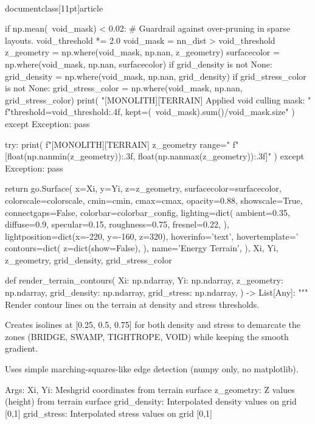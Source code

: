 \\documentclass[11pt]{article}
\begin{document}
\begin{CodeBlock}
            if np.mean(~void_mask) < 0.02:
                # Guardrail against over-pruning in sparse layouts.
                void_threshold *= 2.0
                void_mask = nn_dist > void_threshold
            z_geometry = np.where(void_mask, np.nan, z_geometry)
            surfacecolor = np.where(void_mask, np.nan, surfacecolor)
            if grid_density is not None:
                grid_density = np.where(void_mask, np.nan, grid_density)
            if grid_stress_color is not None:
                grid_stress_color = np.where(void_mask, np.nan, grid_stress_color)
            print(
                "[MONOLITH][TERRAIN] Applied void culling mask: "
                f"threshold={void_threshold:.4f}, kept={(~void_mask).sum()}/{void_mask.size}"
            )
    except Exception:
        pass

    try:
        print(
            f"[MONOLITH][TERRAIN] z_geometry range="
            f"[{float(np.nanmin(z_geometry)):.3f}, {float(np.nanmax(z_geometry)):.3f}]"
        )
    except Exception:
        pass

    return go.Surface(
        x=Xi,
        y=Yi,
        z=z_geometry,
        surfacecolor=surfacecolor,
        colorscale=colorscale,
        cmin=cmin,
        cmax=cmax,
        opacity=0.88,
        showscale=True,
        connectgaps=False,
        colorbar=colorbar_config,
        lighting=dict(
            ambient=0.35,
            diffuse=0.9,
            specular=0.15,
            roughness=0.75,
            fresnel=0.22,
        ),
        lightposition=dict(x=-220, y=-160, z=320),
        hoverinfo='text',
        hovertemplate='%
        contours=dict(
            z=dict(show=False),
        ),
        name='Energy Terrain',
    ), Xi, Yi, z_geometry, grid_density, grid_stress_color

def render_terrain_contours(
    Xi: np.ndarray,
    Yi: np.ndarray,
    z_geometry: np.ndarray,
    grid_density: np.ndarray,
    grid_stress: np.ndarray,
) -> List[Any]:
    """
    Render contour lines on the terrain at density and stress thresholds.

    Creates isolines at [0.25, 0.5, 0.75] for both density and stress to demarcate
    the zones (BRIDGE, SWAMP, TIGHTROPE, VOID) while keeping the smooth gradient.

    Uses simple marching-squares-like edge detection (numpy only, no matplotlib).

    Args:
        Xi, Yi: Meshgrid coordinates from terrain surface
        z_geometry: Z values (height) from terrain surface
        grid_density: Interpolated density values on grid [0,1]
        grid_stress: Interpolated stress values on grid [0,1]


\end{CodeBlock}
\end{document}
